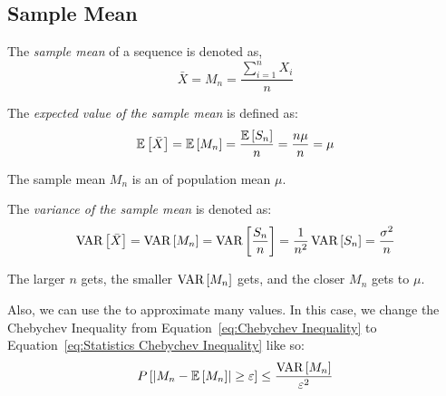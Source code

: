 	\subsection{Sample Mean} \label{subsec:Sample Mean}
		\begin{definition} \label{def:Sample Mean}
			The \emph{sample mean} of a sequence is denoted as,
			\begin{equation} \label{eq:Sample Mean}
				\bar{X} = M_{n} = \frac{\sum_{i=1}^{n} X_{i}}{n}
			\end{equation}
		\end{definition}
		\begin{definition} \label{def:Expected Value of Sample Mean}
			The \emph{expected value of the sample mean} is defined as:
			\begin{equation} \label{eq:Expected Value of Sample Mean}
				\operatorname{\mathbb{E}} \left[ \bar{X} \right]
				= \operatorname{\mathbb{E}} \left[ M_{n} \right]
				= \frac{\operatorname{\mathbb{E}} \left[ S_{n} \right]}{n}
				= \frac{n \mu}{n}
				= \mu
			\end{equation}
			\begin{remark}
				The sample mean $M_{n}$ is an \emph{} of population mean $\mu$.
			\end{remark}
		\end{definition}
		\begin{definition} \label{def:Variance of Sample Mean}
			The \emph{variance of the sample mean} is denoted as:
			\begin{equation} \label{eq:Variance of Sample Mean}
				\operatorname{\text{VAR}} \left[ \bar{X} \right]
				= \operatorname{\text{VAR}} \left[ M_{n} \right]
				= \operatorname{\text{VAR}} \left[ \frac{S_{n}}{n} \right]
				= \frac{1}{n^{2}} \operatorname{\text{VAR}} \left[ S_{n} \right]
				= \frac{\sigma^{2}}{n}
			\end{equation}
			\begin{remark}
				The larger $n$ gets, the smaller $\operatorname{\text{VAR}} \left[ M_{n} \right]$ gets, and the closer $M_{n}$ gets to $\mu$.
			\end{remark}
		\end{definition}
			
	Also, we can use the  to approximate many values. In this case, we change the Chebychev Inequality from Equation~\eqref{eq:Chebychev Inequality} to Equation~\eqref{eq:Statistics Chebychev Inequality} like so:
		\begin{equation} \label{eq:Statistics Chebychev Inequality}
			P \left[ \lvert M_{n} - \operatorname{\mathbb{E}} \left[ M_{n} \right] \rvert \geq \varepsilon \right] \leq \frac{\operatorname{\text{VAR}} \left[ M_{n} \right]}{\varepsilon^{2}}
		\end{equation}
		
